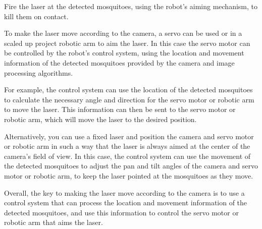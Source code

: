 \documentclass[11pt]{article}
\begin{document}
Fire the laser at the detected mosquitoes, using the robot's aiming mechanism, to kill them on contact.


To make the laser move according to the camera, a servo can be used or in a scaled up project robotic arm to aim the laser. In this case the servo motor can be controlled by the robot's control system, using the location and movement information of the detected mosquitoes provided by the camera and image processing algorithms.

For example, the control system can use the location of the detected mosquitoes to calculate the necessary angle and direction for the servo motor or robotic arm to move the laser. This information can then be sent to the servo motor or robotic arm, which will move the laser to the desired position.

Alternatively, you can use a fixed laser and position the camera and servo motor or robotic arm in such a way that the laser is always aimed at the center of the camera's field of view. In this case, the control system can use the movement of the detected mosquitoes to adjust the pan and tilt angles of the camera and servo motor or robotic arm, to keep the laser pointed at the mosquitoes as they move.

Overall, the key to making the laser move according to the camera is to use a control system that can process the location and movement information of the detected mosquitoes, and use this information to control the servo motor or robotic arm that aims the laser.








	

	
	
\end{document}
